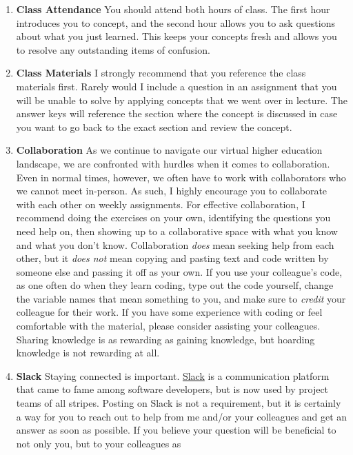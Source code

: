 \documentclass[11pt,]{article}
\begin{document}
\begin{enumerate}
\def\labelenumi{\arabic{enumi}.}
\item
  \textbf{Class Attendance} You should attend both hours of class. The
  first hour introduces you to concept, and the second hour allows you
  to ask questions about what you just learned. This keeps your concepts
  fresh and allows you to resolve any outstanding items of confusion.
\item
  \textbf{Class Materials} I strongly recommend that you reference the
  class materials first. Rarely would I include a question in an
  assignment that you will be unable to solve by applying concepts that
  we went over in lecture. The answer keys will reference the section
  where the concept is discussed in case you want to go back to the
  exact section and review the concept.
\item
  \textbf{Collaboration} As we continue to navigate our virtual higher
  education landscape, we are confronted with hurdles when it comes to
  collaboration. Even in normal times, however, we often have to work
  with collaborators who we cannot meet in-person. As such, I highly
  encourage you to collaborate with each other on weekly assignments.
  For effective collaboration, I recommend doing the exercises on your
  own, identifying the questions you need help on, then showing up to a
  collaborative space with what you know and what you don't know.
  Collaboration \emph{does} mean seeking help from each other, but it
  \emph{does not} mean copying and pasting text and code written by
  someone else and passing it off as your own. If you use your
  colleague's code, as one often do when they learn coding, type out the
  code yourself, change the variable names that mean something to you,
  and make sure to \emph{credit} your colleague for their work. If you
  have some experience with coding or feel comfortable with the
  material, please consider assisting your colleagues. Sharing knowledge
  is as rewarding as gaining knowledge, but hoarding knowledge is not
  rewarding at all.
\item
  \textbf{Slack} Staying connected is important.
  \href{https://slack.com/}{Slack} is a communication platform that came
  to fame among software developers, but is now used by project teams of
  all stripes. Posting on Slack is not a requirement, but it is
  certainly a way for you to reach out to help from me and/or your
  colleagues and get an answer as soon as possible. If you believe your
  question will be beneficial to not only you, but to your colleagues as

\end{enumerate}
\end{document}
